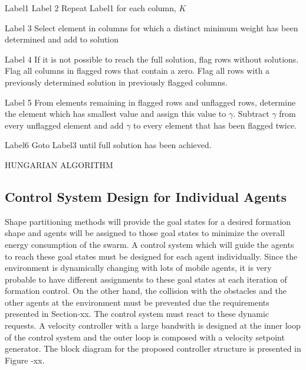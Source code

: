 \documentclass[twoside]{article}
\begin{document}
	\begin{algorithm}[H]
	
	     Label1  \;
	   Label 2  \; 
	   {Repeat Label1 for each column, $K$}
   
      Label 3  \; 
      Select element in columns for which a distinct minimum weight has been determined and add to solution
     
     Label 4 \;
     If it is not possible to reach the full solution, flag rows without solutions. Flag all columns in flagged rows that contain a zero. Flag all rows with a previously determined solution in previously flagged columns.
     
     Label 5 \;
     From elements remaining in flagged rows and unflagged rows, determine the element which has smallest value and assign this value to $\gamma$. Subtract $\gamma$  from every unflagged element and add  $\gamma$ to every element that has been flagged twice.
     
     Label6 \;
     Goto Label3 until full solution has been achieved.
     
     		\caption{HUNGARIAN ALGORITHM}
		\end{algorithm}
	
	\subsection{Control System Design for Individual Agents}
Shape partitioning methods will provide the goal states for a desired formation shape and agents will be assigned to those goal states to minimize the overall energy consumption of the swarm. A control system which will guide the agents to reach these goal states must be designed for each agent individually. Since the environment is dynamically changing with lots of  mobile agents, it is very probable to have different assignments to these goal states at each iteration of formation control. On the other hand, the collision with the obstacles and the other agents at the environment must be prevented due the requirements presented in Section-xx. The control system must react to these dynamic requests. A velocity controller with a large bandwith is designed at the inner loop of the control system and the outer loop is composed with a velocity setpoint generator. The block diagram for the proposed controller structure is presented in Figure -xx.
\end{document}
